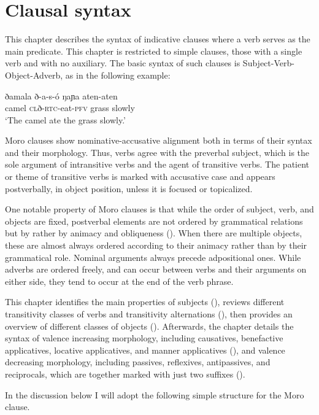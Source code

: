 \chapter{Clausal syntax}\label{chapter:syntax}

This chapter describes the syntax of indicative clauses where a verb serves as the main predicate. This chapter is restricted to simple clauses, those with a single verb and with no auxiliary. The basic syntax of such clauses is Subject-Verb-Object-Adverb, as in the following example:

\ea \gll ðamala ð-a-s-ó ŋaɲa aten-aten\\
camel \textsc{cl}ð-\textsc{rtc}-eat-\textsc{pfv} grass slowly\\
\glt `The camel ate the grass slowly.' 
\z  

Moro clauses show nominative-accusative alignment both in terms of their syntax and their morphology. Thus, verbs agree with the preverbal subject, which is the sole argument of intransitive verbs and the agent of transitive verbs. The patient or theme of transitive verbs is marked with accusative case and appears postverbally, in object position, unless it is focused or topicalized. 

One notable property of Moro clauses is that while the order of subject, verb, and objects are fixed, postverbal elements are not ordered by grammatical relations but by rather by animacy and obliqueness (). When there are multiple objects, these are almost always ordered according to their animacy rather than by their grammatical role. Nominal arguments always precede adpositional ones. While adverbs are ordered freely, and can occur between verbs and their arguments on either side, they tend to occur at the end of the verb phrase. 

This chapter identifies the main properties of subjects (), reviews different transitivity classes of verbs and transitivity alternations (), then provides an overview of different classes of objects (). Afterwards, the chapter details the syntax of valence increasing morphology, including causatives, benefactive applicatives, locative applicatives, and manner applicatives (), and valence decreasing morphology, including passives, reflexives,  antipassives, and reciprocals, which are together marked with just two suffixes ().

In the discussion below I will adopt the following simple structure for the Moro clause.

